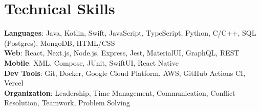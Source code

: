 \documentclass[letterpaper,11pt]{article}
\begin{document}
\section{Technical Skills}
\begin{itemize}[leftmargin=0.15in, label={}]
	\small{\item{
	      \textbf{Languages}{: Java, Kotlin, Swift, JavaScript, TypeScript, Python, C/C++, SQL (Postgres), MongoDB, HTML/CSS} \\
	      \textbf{Web}{: React, Next.js, Node.js, Express, Jest, MaterialUI, GraphQL, REST} \\
	      \textbf{Mobile}{: XML, Compose, JUnit, SwiftUI, React Native} \\
	      \textbf{Dev Tools}{: Git, Docker, Google Cloud Platform, AWS, GitHub Actions CI, Vercel} \\
		  \textbf{Organization}{: Leadership, Time Management, Communication, Conflict Resolution, Teamwork, Problem Solving}
	      }}
\end{itemize}

\end{document}
